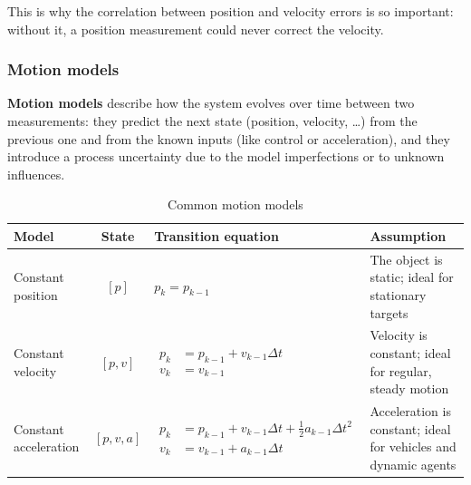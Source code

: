 \vspace{6pt}This is why the correlation between position and velocity errors is so important: without it, a position measurement could never correct the velocity.

\subsubsection{Motion models}
\textbf{Motion models} describe how the system evolves over time between two measurements: they predict the next state (position, velocity, \dots) from the previous one and from the known inputs (like control or acceleration), and they introduce a process uncertainty due to the model imperfections or to unknown influences.

\begin{table}[H]
    \centering
    \begin{tabular}{|l|c|l|p{5.3cm}|}
        \hline
        \textbf{Model} & \textbf{State} & \textbf{Transition equation} & \textbf{Assumption} \\
        \hline
        Constant position & $[p]$ & $p_k = p_{k-1}$ & The object is static; ideal for stationary targets \\
        \hline
        Constant velocity & $[p, v]$ & $\begin{aligned} p_k &= p_{k-1} + v_{k-1}\Delta t \\ v_k &= v_{k-1}\end{aligned}$ & Velocity is constant; ideal for regular, steady motion \\
        \hline
        Constant acceleration & $[p, v, a]$ & $\begin{aligned} p_k &= p_{k-1} + v_{k-1}\Delta t + \tfrac{1}{2}a_{k-1}\Delta t^2 \\ v_k &= v_{k-1} + a_{k-1}\Delta t\end{aligned}$ & Acceleration is constant; ideal for vehicles and dynamic agents \\
        \hline
    \end{tabular}
    \caption{Common motion models}
\end{table}
